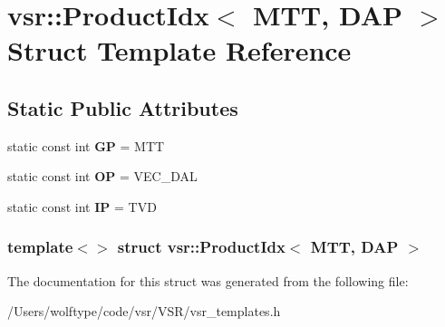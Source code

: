 \hypertarget{structvsr_1_1_product_idx_3_01_m_t_t_00_01_d_a_p_01_4}{\section{vsr\-:\-:Product\-Idx$<$ M\-T\-T, D\-A\-P $>$ Struct Template Reference}
\label{structvsr_1_1_product_idx_3_01_m_t_t_00_01_d_a_p_01_4}
}
\subsection*{Static Public Attributes}
\begin{DoxyCompactItemize}
\item 
\hypertarget{structvsr_1_1_product_idx_3_01_m_t_t_00_01_d_a_p_01_4_ab59f0581e728442cead603b01212e069}{static const int {\bfseries G\-P} = M\-T\-T}\label{structvsr_1_1_product_idx_3_01_m_t_t_00_01_d_a_p_01_4_ab59f0581e728442cead603b01212e069}

\item 
\hypertarget{structvsr_1_1_product_idx_3_01_m_t_t_00_01_d_a_p_01_4_ad577f3fc6c35116449231892af2f04a7}{static const int {\bfseries O\-P} = V\-E\-C\-\_\-\-D\-A\-L}\label{structvsr_1_1_product_idx_3_01_m_t_t_00_01_d_a_p_01_4_ad577f3fc6c35116449231892af2f04a7}

\item 
\hypertarget{structvsr_1_1_product_idx_3_01_m_t_t_00_01_d_a_p_01_4_ae8b04c27fb8be4b2a412d42c004796f5}{static const int {\bfseries I\-P} = T\-V\-D}\label{structvsr_1_1_product_idx_3_01_m_t_t_00_01_d_a_p_01_4_ae8b04c27fb8be4b2a412d42c004796f5}

\end{DoxyCompactItemize}
\subsubsection*{template$<$$>$ struct vsr\-::\-Product\-Idx$<$ M\-T\-T, D\-A\-P $>$}



The documentation for this struct was generated from the following file\-:\begin{DoxyCompactItemize}
\item 
/\-Users/wolftype/code/vsr/\-V\-S\-R/vsr\-\_\-templates.\-h\end{DoxyCompactItemize}
